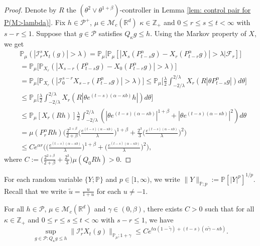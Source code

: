 \documentclass[EJP]{ejpecp} %
\begin{document}
\begin{proof}
  Denote by $R$ the $(\theta^2\vee\theta^{1+\beta})$-controller in Lemma \ref{lem: control pair for P(M>lambda)}.
  Fix $h \in \mathcal P^+$, $\mu \in \mathcal M_c(\mathbb R^d)$ $\kappa \in \mathbb Z_+ $ and $0\leq r\leq s\leq t < \infty$ with $s-r \leq 1$.
  Suppose that $g\in \mathcal P$ satisfies $Q_\kappa g \leq h$.
  Using the Markov property of $X$, we get
  \begin{align}
   & \mathbb P_{\mu}(|\mathcal I_r^sX_t(g)|>\lambda)
      = \mathbb P_\mu \Big[\mathbb P_\mu [| X_{s}(P_{t-s}^\alpha g) -  X_{r}(P_{t-r}^\alpha g)|> \lambda | \mathscr F_r ]\Big] \\
     & = \mathbb P_\mu \big[\mathbb P_{X_r}(| X_{s-r}(P_{t-s}^\alpha g) -  X_{0}(P_{t-r}^\alpha g)|> \lambda)\big] \\
    & = \mathbb P_\mu \big[\mathbb P_{X_r}(|\mathcal I_0^{s-r} X_{s-r}( P_{t-s}^\alpha g) |> \lambda)\big]
      \leq \mathbb P_\mu \Big[ \frac{\lambda}{2}\int_{-2/\lambda}^{2/\lambda}X_r(R|\theta P^\alpha_{t-s}g|) d\theta \Big] \\
     & \leq \mathbb P_\mu \Big[ \frac{\lambda}{2}\int_{-2/\lambda}^{2/\lambda}X_r(R|\theta e^{(t-s)(\alpha- \kappa b)}h|) d\theta \Big] \\
     & \leq \mathbb P_\mu [X_r(Rh) ]
\frac{\lambda}{2}\int_{-2/\lambda}^{2/\lambda}(|\theta e^{(t-s)(\alpha- \kappa b)}|^{1+\beta} + |\theta e^{(t-s)(\alpha- \kappa b)}|^{2})d\theta
     \\ & =  \mu(P_r^\alpha Rh)
\Big(  \frac{2^{2+\beta}}{2+\beta}\Big(\frac{e^{(t-s)(\alpha- \kappa b)}}{\lambda}\Big)^{1+\beta} + \frac{2^{3}}{3}\Big(\frac{e^{(t-s)(\alpha- \kappa b)}}{\lambda}\Big)^2\Big)
    \\ & \leq C e^{\alpha r} \Big(\Big( \frac{e^{(t-s)(\alpha - \kappa b)}}{\lambda}\Big)^{1+\beta} + \Big( \frac{e^{(t-s)(\alpha - \kappa b)}}{\lambda}\Big)^{2} \Big),
  \end{align}
where $C := \Big(\frac{2^{2+\beta}}{2+\beta} + \frac{2^{3}}{3} \Big) \mu(Q_0Rh)>0$.
\end{proof}

For each random variable $\{Y; \mathbb P\}$ and $p \in [1,\infty)$, we write $ \|Y\|_{\mathbb P;p} := \mathbb P[|Y|^p]^{1/p}$.
Recall that we write $\tilde u = \frac{u}{1+u}$ for each $u\neq -1$.
\begin{lemma}
  \label{lem: control of mgtrs}
  For all $h \in \mathcal P$, $\mu \in \mathcal M_c(\mathbb R^d)$ and $\gamma\in (0, \beta)$, there exists $C > 0$ such that for all $\kappa \in \mathbb Z_+$ and $0\leq r \leq s\leq t<\infty$ with $s-r \leq 1$, we have
  \[
     \sup_{g \in \mathcal P: Q_\kappa g \leq h} \|\mathcal I_r^s X_t(g) \|_{\mathbb P_\mu;1+\gamma}
    \leq C e^{t\alpha (1- \tilde \gamma)+(t-s) (\alpha \tilde \gamma - \kappa b)}.
  \]
\end{lemma}
\end{document}
